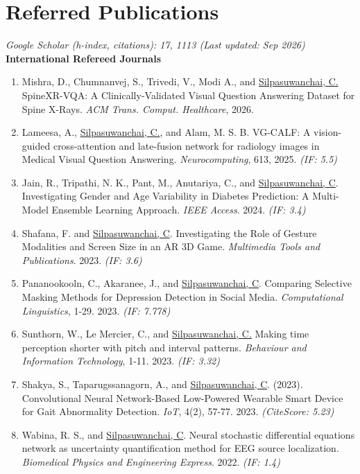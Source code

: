 \documentclass[letterpaper,11pt]{article}
\makeatletter
\newlength{\bibhang}
\newlength{\bibsep}
{\@listi \global\bibsep\itemsep \global\advance\bibsep by\parsep}
\newenvironment{bibsection}%
{\begin{enumerate}{}{%
			
			\setlength{\leftmargin}{\bibhang}%
			\setlength{\itemindent}{-\leftmargin}%
			\setlength{\itemsep}{\bibsep}%
			\setlength{\parsep}{\z@}%
			\setlength{\partopsep}{0pt}%
			\setlength{\topsep}{0pt}}}
	{\end{enumerate}}
\makeatother
\begin{document}
  \section{Referred Publications}
  \footnotesize
   \textit{Google Scholar (h-index, citations): 17, 1113 (Last updated: Sep 2026)}
   \\[0.1in]
   \textbf{International Refereed Journals}
  \small
  \begin{bibsection}
  	\footnotesize
    \item Mishra, D., Chumnanvej, S., Trivedi, V., Modi A., and \underline{Silpasuwanchai, C.} SpineXR-VQA: A Clinically-Validated Visual Question Answering Dataset for Spine X-Rays. \textit{ACM Trans. Comput. Healthcare}, 2026.
    \item Lameesa, A., \underline{Silpasuwanchai, C.}, and Alam, M. S. B. VG-CALF: A vision-guided cross-attention and late-fusion network for radiology images in Medical Visual Question Answering. \textit{Neurocomputing}, 613, 2025. \textit{(IF: 5.5)}
    \item Jain, R., Tripathi, N. K., Pant, M., Anutariya, C., and \underline{Silpasuwanchai, C}. Investigating Gender and Age Variability in Diabetes Prediction: A Multi-Model Ensemble Learning Approach. \textit{IEEE Access}. 2024. \textit{(IF: 3.4)}
    \item Shafana, F. and \underline{Silpasuwanchai, C}. Investigating the Role of Gesture Modalities and Screen Size in an AR 3D Game. \textit{Multimedia Tools and Publications}. 2023. \textit{(IF: 3.6)}
    \item Pananookooln, C., Akaranee, J., and \underline{Silpasuwanchai, C}. Comparing Selective Masking Methods for Depression Detection in Social Media. \textit{Computational Linguistics}, 1-29. 2023. \textit{(IF: 7.778)}
    \item Sunthorn, W., Le Mercier, C., and \underline{Silpasuwanchai, C.} Making time perception shorter with pitch and interval patterns. \textit{Behaviour and Information Technology}, 1-11. 2023. \textit{(IF: 3.32)}
    \item Shakya, S., Taparugssanagorn, A., and \underline{Silpasuwanchai, C}. (2023). Convolutional Neural Network-Based Low-Powered Wearable Smart Device for Gait Abnormality Detection. \textit{IoT}, 4(2), 57-77. 2023. \textit{(CiteScore: 5.23)}
    \item Wabina, R. S., and \underline{Silpasuwanchai, C}. Neural stochastic differential equations network as uncertainty quantification method for EEG source localization. \textit{Biomedical Physics and Engineering Express}. 2022. \textit{(IF: 1.4)}

\end{bibsection}
\end{document}
